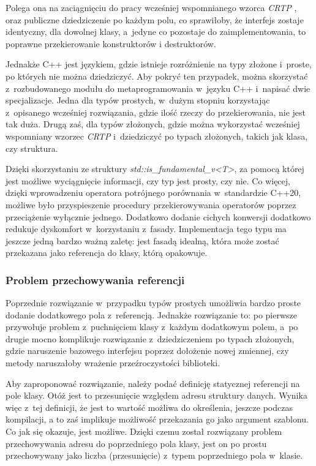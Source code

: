 \documentclass[12pt]{article}
\newcommand{\n}{\newline}
\newcommand{\nonpl}[1]{{\it #1}}
\newcommand{\code}[1]{{\it #1}}
\newcommand{\CRTP}{\nonpl{CRTP} }
\begin{document}
{{{				Polega ona na zaciągnięciu do pracy wcześniej wspomnianego wzorca \CRTP, oraz publiczne dziedziczenie po każdym polu, co sprawiłoby, że
				interfejs zostaje identyczny, dla dowolnej klasy, a~jedyne co pozostaje do zaimplementowania, to poprawne przekierowanie konstruktorów
				i destruktorów.\n

				Jednakże C++ jest językiem, gdzie istnieje rozróżnienie na typy złożone i~proste, po których nie można dziedziczyć. Aby pokryć ten przypadek,
				można skorzystać z~rozbudowanego modułu do metaprogramowania w~języku C++ i~napisać dwie specjalizacje. Jedna dla typów prostych, w~dużym stopniu
				korzystając z~opisanego wcześniej rozwiązania, gdzie ilość rzeczy do przekierowania, nie jest tak duża. Drugą zaś, dla typów złożonych,
				gdzie można wykorzystać wcześniej wspomniany wzorzec \CRTP i~dziedziczyć po typach złożonych, takich jak klasa, czy struktura.\n

				Dzięki skorzystaniu ze struktury \code{std::is\_fundamental\_v<T>}\cite{std_is_fundamental}, za pomocą której jest możliwe wyciągnięcie informacji,
				czy typ jest prosty, czy nie. Co więcej, dzięki wprowadzeniu operatora potrójnego porównania \cite{starship_operator} w~standardzie C++20, możliwe było
				przyspieszenie procedury przekierowywania operatorów poprzez przeciążenie wyłącznie jednego. Dodatkowo dodanie cichych konwersji dodatkowo redukuje
				dyskomfort w~korzystaniu z~fasady. Implementacja tego typu ma jeszcze jedną bardzo ważną zaletę: jest fasadą idealną, która może zostać przekazana jako referencja
				do klasy, którą opakowuje.
			}

			{
				\subsubsection{Problem przechowywania referencji}

				Poprzednie rozwiązanie w~przypadku typów prostych umożliwia bardzo proste dodanie dodatkowego pola z~referencją. Jednakże rozwiązanie to:
				po pierwsze przywołuje problem z~puchnięciem klasy z~każdym dodatkowym polem, a~po drugie mocno komplikuje rozwiązanie z~dziedziczeniem po
				typach złożonych, gdzie naruszenie bazowego interfejsu poprzez dołożenie nowej zmiennej, czy metody naruszałoby wrażenie przeźroczystości
				biblioteki.\n

				Aby zaproponować rozwiązanie, należy podać definicję statycznej referencji na pole klasy. Otóż jest to przesunięcie względem
				adresu struktury danych. Wynika więc z~tej definicji, że jest to wartość możliwa do określenia, jeszcze podczas kompilacji,
				a to zaś implikuje możliwość przekazania go jako argument szablonu. Co jak się okazuje, jest możliwe. Dzięki czemu został rozwiązany problem
				przechowywania adresu do poprzedniego pola klasy, jest on po prostu przechowywany jako liczba (przesunięcie) z~typem poprzedniego pola w~klasie.\n

}}}
\end{document}
